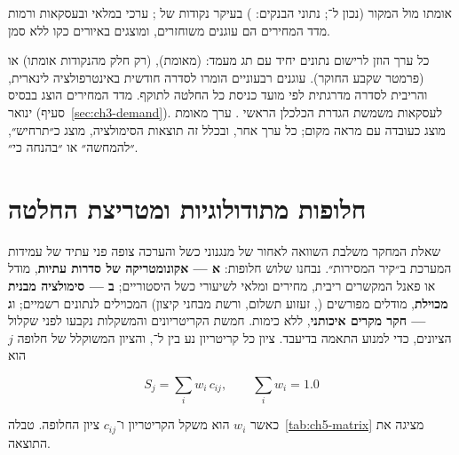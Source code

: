 אומתו מול המקור (נכון ל־; נתוני הבנקים: ) בעיקר נקודות של ; ערכי  במלאי ובעסקאות ורמות מדד המחירים הם עוגנים משוחזרים, ומוצגים באיורים כקו ללא סמן.

\label{sec:ch5-cleaning}כל ערך הוזן לרישום נתונים יחיד עם תג מעמד:  (מאומת),  (רק חלק מהנקודות אומתו) או  (פרמטר שקבע החוקר). עוגנים רבעוניים הומרו לסדרה חודשית באינטרפולציה לינארית, והריבית לסדרה מדרגתית לפי מועד כניסת כל החלטה לתוקף. מדד המחירים הוצג בבסיס ינואר  (סעיף~\ref{sec:ch3-demand}). לעסקאות משמשת הגדרת הכלכלן הראשי \cite{toi_housing_2026_10}. ערך מאומת מוצג כעובדה עם מראה מקום; כל ערך אחר, ובכלל זה תוצאות הסימולציה, מוצג כ״תרחיש״, ״להמחשה״ או ״בהנחה כי״.

\section{חלופות מתודולוגיות ומטריצת החלטה}
\label{sec:ch5-alternatives}

שאלת המחקר משלבת השוואה לאחור של מנגנוני כשל והערכה צופה פני עתיד של עמידות המערכת ב״קיר המסירות״. נבחנו שלוש חלופות: \textbf{א — אקונומטריקה של סדרות עתיות}, מודל  או פאנל המקשרים ריבית, מחירים ומלאי לשיעורי כשל היסטוריים; \textbf{ב — סימולציה מבנית מכוילת}, מודלים מפורשים (, זעזוע תשלום,  ורשת מבחני קיצון) המכוילים לנתונים רשמיים; ו\textbf{ג — חקר מקרים איכותני},  ללא כימות. חמשת הקריטריונים והמשקלות נקבעו לפני שקלול הציונים, כדי למנוע התאמה בדיעבד. ציון כל קריטריון נע בין  ל־, והציון המשוקלל של חלופה $j$ הוא

\begin{equation}
S_j=\sum_{i} w_i\, c_{ij}, \qquad \sum_i w_i = 1.0
\label{eq:ch5-score}
\end{equation}

כאשר $w_i$ הוא משקל הקריטריון ו־$c_{ij}$ ציון החלופה. טבלה~\ref{tab:ch5-matrix} מציגה את התוצאה.

